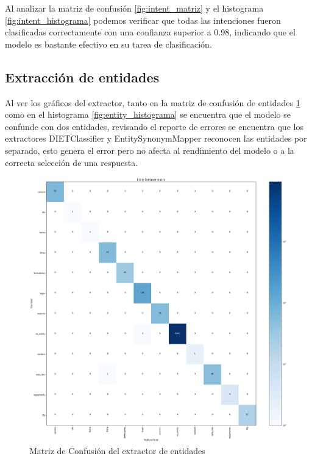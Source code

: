 Al analizar la matriz de confusión \ref{fig:intent_matriz} y el histograma
\ref{fig:intent_histograma} podemos verificar que todas las intenciones fueron clasificadas
correctamente con una confianza superior a 0.98, indicando que el modelo es bastante efectivo en su
tarea de clasificación.
\subsection{Extracción de entidades}
Al ver los gráficos del extractor, tanto en la matriz de confusión de entidades
\ref{fig:entity_matriz} como en el histograma \ref{fig:entity_histograma} se encuentra que el
modelo se confunde con dos entidades, revisando el reporte de errores se encuentra que los
extractores DIETClassifier y EntitySynonymMapper reconocen las entidades por separado, esto genera
el error pero no afecta al rendimiento del modelo o a la correcta selección de una respuesta.

\begin{figure}[H]
	\centering
	\includegraphics[width=\textwidth]{imagenes/cap5/DIETClassifier_confusion_matrix.png}
	\caption{Matriz de Confusión del extractor de entidades}
	\label{fig:entity_matriz}
\end{figure}


